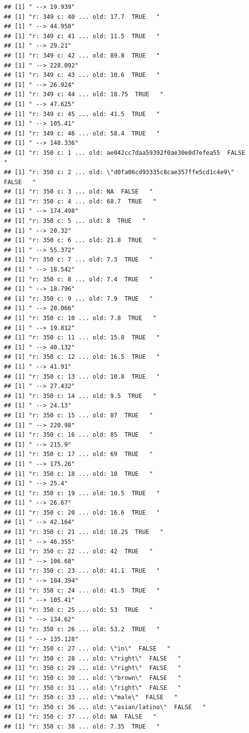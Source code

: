 \documentclass[]{article}
\begin{document}
\begin{verbatim}
## [1] " --> 19.939"
## [1] "r: 349 c: 40 ... old: 17.7  TRUE   "
## [1] " --> 44.958"
## [1] "r: 349 c: 41 ... old: 11.5  TRUE   "
## [1] " --> 29.21"
## [1] "r: 349 c: 42 ... old: 89.8  TRUE   "
## [1] " --> 228.092"
## [1] "r: 349 c: 43 ... old: 10.6  TRUE   "
## [1] " --> 26.924"
## [1] "r: 349 c: 44 ... old: 18.75  TRUE   "
## [1] " --> 47.625"
## [1] "r: 349 c: 45 ... old: 41.5  TRUE   "
## [1] " --> 105.41"
## [1] "r: 349 c: 46 ... old: 58.4  TRUE   "
## [1] " --> 148.336"
## [1] "r: 350 c: 1 ... old: ae042cc7daa59392f0ae30e0d7efea55  FALSE   "
## [1] "r: 350 c: 2 ... old: \"d0fa06cd93335c8cae357ffe5cd1c4e9\"  FALSE   "
## [1] "r: 350 c: 3 ... old: NA  FALSE   "
## [1] "r: 350 c: 4 ... old: 68.7  TRUE   "
## [1] " --> 174.498"
## [1] "r: 350 c: 5 ... old: 8  TRUE   "
## [1] " --> 20.32"
## [1] "r: 350 c: 6 ... old: 21.8  TRUE   "
## [1] " --> 55.372"
## [1] "r: 350 c: 7 ... old: 7.3  TRUE   "
## [1] " --> 18.542"
## [1] "r: 350 c: 8 ... old: 7.4  TRUE   "
## [1] " --> 18.796"
## [1] "r: 350 c: 9 ... old: 7.9  TRUE   "
## [1] " --> 20.066"
## [1] "r: 350 c: 10 ... old: 7.8  TRUE   "
## [1] " --> 19.812"
## [1] "r: 350 c: 11 ... old: 15.8  TRUE   "
## [1] " --> 40.132"
## [1] "r: 350 c: 12 ... old: 16.5  TRUE   "
## [1] " --> 41.91"
## [1] "r: 350 c: 13 ... old: 10.8  TRUE   "
## [1] " --> 27.432"
## [1] "r: 350 c: 14 ... old: 9.5  TRUE   "
## [1] " --> 24.13"
## [1] "r: 350 c: 15 ... old: 87  TRUE   "
## [1] " --> 220.98"
## [1] "r: 350 c: 16 ... old: 85  TRUE   "
## [1] " --> 215.9"
## [1] "r: 350 c: 17 ... old: 69  TRUE   "
## [1] " --> 175.26"
## [1] "r: 350 c: 18 ... old: 10  TRUE   "
## [1] " --> 25.4"
## [1] "r: 350 c: 19 ... old: 10.5  TRUE   "
## [1] " --> 26.67"
## [1] "r: 350 c: 20 ... old: 16.6  TRUE   "
## [1] " --> 42.164"
## [1] "r: 350 c: 21 ... old: 18.25  TRUE   "
## [1] " --> 46.355"
## [1] "r: 350 c: 22 ... old: 42  TRUE   "
## [1] " --> 106.68"
## [1] "r: 350 c: 23 ... old: 41.1  TRUE   "
## [1] " --> 104.394"
## [1] "r: 350 c: 24 ... old: 41.5  TRUE   "
## [1] " --> 105.41"
## [1] "r: 350 c: 25 ... old: 53  TRUE   "
## [1] " --> 134.62"
## [1] "r: 350 c: 26 ... old: 53.2  TRUE   "
## [1] " --> 135.128"
## [1] "r: 350 c: 27 ... old: \"in\"  FALSE   "
## [1] "r: 350 c: 28 ... old: \"right\"  FALSE   "
## [1] "r: 350 c: 29 ... old: \"right\"  FALSE   "
## [1] "r: 350 c: 30 ... old: \"brown\"  FALSE   "
## [1] "r: 350 c: 31 ... old: \"right\"  FALSE   "
## [1] "r: 350 c: 33 ... old: \"male\"  FALSE   "
## [1] "r: 350 c: 36 ... old: \"asian/latino\"  FALSE   "
## [1] "r: 350 c: 37 ... old: NA  FALSE   "
## [1] "r: 350 c: 38 ... old: 7.35  TRUE   "

\end{verbatim}
\end{document}
